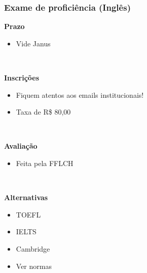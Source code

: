 \documentclass{beamer}
\begin{document}
\begin{frame}
  \frametitle{Exame de proficiência (Inglês)}

  \textbf{Prazo}
  \begin{itemize}
    \item Vide Janus
  \end{itemize}~\\\pause

  \textbf{Inscrições}
  \begin{itemize}
    \item Fiquem atentos aos emails institucionais!
    \item Taxa de R\$ 80,00
  \end{itemize}~\\\pause

  \textbf{Avaliação}
  \begin{itemize}
    \item Feita pela FFLCH
  \end{itemize}~\\\pause

  \textbf{Alternativas}
  \begin{multicols}{2}
  \begin{itemize}
    \item TOEFL
    \item IELTS\columnbreak
    \item Cambridge
    \item Ver normas
  \end{itemize}
  \end{multicols}
\end{frame}




\end{document}
